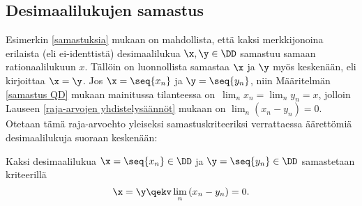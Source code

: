 \subsection*{Desimaalilukujen samastus}

Esimerkin \ref{samastuksia} mukaan on mahdollista, että kaksi merkkijonoina erilaista
(eli ei-identtistä) desimaalilukua $\x,\y\in\DD$ samastuu samaan rationaalilukuun $x$. Tällöin
on luonnollista samastaa $\x$ ja $\y$ myös keskenään, eli kirjoittaa $\x=\y$. Jos $\x=\seq{x_n}$
ja $\y=\seq{y_n}$, niin Määritelmän \ref{samastus QD} mukaan mainitussa tilanteessa on
$\,\lim_n x_n = \lim_n y_n = x$, jolloin Lauseen \ref{raja-arvojen yhdistelysäännöt} mukaan on
$\lim_n (x_n-y_n) = 0$. Otetaan tämä raja-arvoehto yleiseksi samastuskriteeriksi verrattaessa 
äärettömiä desimaalilukuja suoraan keskenään:
\begin{Def} \label{samastus DD}  Kaksi
desimaalilukua $\x = \seq{x_n} \in \DD$ ja $\y = \seq{y_n} \in \DD$ samastetaan kriteerillä
\[
\x = \y \qekv \lim_n\,(x_n - y_n) = 0.
\] 
\end{Def}

